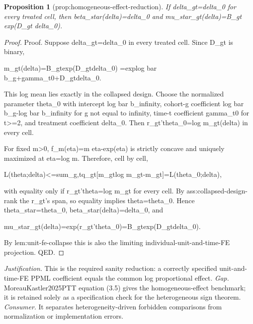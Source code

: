 \documentclass{article}
\newtheorem{proposition}{Proposition}
\begin{document}
\begin{proposition}[prop:homogeneous-effect-reduction]\label{prop:homogeneous-effect-reduction}
If delta_gt=delta_0 for every treated cell, then beta_star(delta)=delta_0 and mu_star_gt(delta)=B_gt exp(D_gt delta_0).
\end{proposition}
\begin{proof}
Proof. Suppose delta_{gt}=delta_0 in every treated cell. Since D_{gt} is binary,

  m_{gt}(delta)=B_{gt}exp(D_{gt}delta_0)
              =exp{log bar b_g+gamma_{t0}+D_{gt}delta_0}.

This log mean lies exactly in the collapsed design. Choose the normalized parameter theta_0 with intercept log bar b_infinity, cohort-g coefficient log bar b_g-log bar b_infinity for g not equal to infinity, time-t coefficient gamma_{t0} for t>=2, and treatment coefficient delta_0. Then r_{gt}'theta_0=log m_{gt}(delta) in every cell.

For fixed m>0, f_m(eta)=m eta-exp(eta) is strictly concave and uniquely maximized at eta=log m. Therefore, cell by cell,

  L(theta;delta)<=sum_{g,t}q_{gt}[m_{gt}log m_{gt}-m_{gt}]=L(theta_0;delta),

with equality only if r_{gt}'theta=log m_{gt} for every cell. By ass:collapsed-design-rank the r_{gt}'s span, so equality implies theta=theta_0. Hence theta_star=theta_0, beta_star(delta)=delta_0, and

  mu_star_{gt}(delta)=exp(r_{gt}'theta_0)=B_{gt}exp(D_{gt}delta_0).

By lem:unit-fe-collapse this is also the limiting individual-unit-and-time-FE projection. QED.
\end{proof}
\par\smallskip\noindent \textit{Justification.} This is the required sanity reduction: a correctly specified unit-and-time-FE PPML coefficient equals the common log proportional effect. \textit{Gap.} MoreauKastler2025PTT equation (3.5) gives the homogeneous-effect benchmark; it is retained solely as a specification check for the heterogeneous sign theorem. \textit{Consumer.} It separates heterogeneity-driven forbidden comparisons from normalization or implementation errors.
\end{document}
